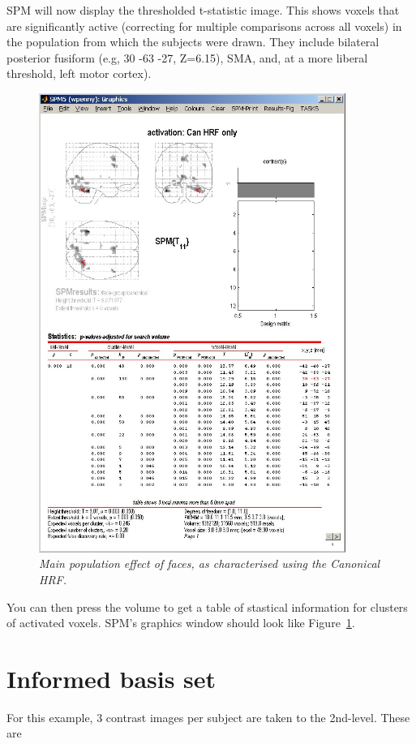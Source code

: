 SPM will now display the thresholded t-statistic image. This shows voxels that are significantly active (correcting for multiple comparisons across all voxels) in the population from which the subjects were drawn. They include bilateral posterior fusiform (e.g, 30 -63 -27, Z=6.15), SMA, and, at a more liberal threshold, left motor cortex). 
\begin{figure}
\begin{center}
\includegraphics[width=100mm]{t1_res}
\caption{\em Main population effect of faces, as characterised using the Canonical HRF. \label{t1_res}}
\end{center}
\end{figure}
You can then press the volume to get a table of stastical information for clusters of activated voxels. SPM's graphics window should look like Figure~\ref{t1_res}.

\section{Informed basis set}

For this example, 3 contrast images per subject are taken to the 2nd-level. These are

